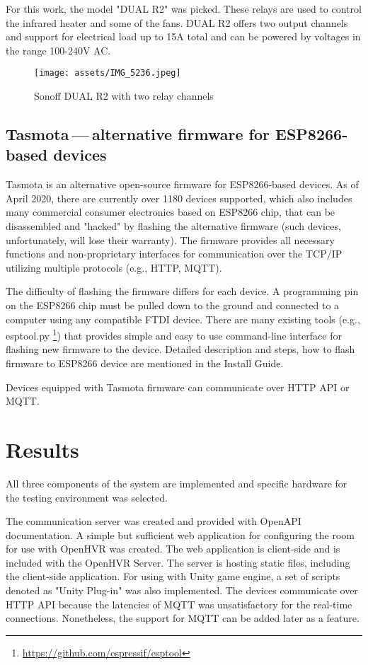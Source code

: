 For this work, the model "DUAL R2" was picked. These relays are used to
control the infrared heater and some of the fans. DUAL R2 offers two output
channels and support for electrical load up to 15A total and can be powered
by voltages in the range 100-240V AC.


\begin{figure}[h]{}
\centering\texttt{[image: assets/IMG\_5236.jpeg]}
\caption{Sonoff DUAL R2 with two relay channels}

\end{figure}

\hypertarget{x-tasmota — alternative-firmware-for-esp8266-based-devices}{\subsection{Tasmota — alternative firmware for ESP8266-based devices}}
Tasmota is an alternative open-source firmware for ESP8266-based devices.
As of April 2020, there are currently over 1180 devices supported\cite{tasdirec},
which also includes many commercial consumer electronics based on ESP8266 chip,
that can be disassembled and "hacked" by flashing the alternative firmware
(such devices, unfortunately, will lose their warranty).
The firmware provides all necessary functions and non-proprietary
interfaces for communication over the TCP/IP utilizing multiple protocols
(e.g., HTTP, MQTT).


The difficulty of flashing the firmware differs for each device. A programming pin
on the ESP8266 chip must be pulled down to the ground and connected to a computer using
any compatible FTDI device. There are many existing tools (e.g., esptool.py
\footnote{\href{https://github.com/espressif/esptool}{https://github.com/espressif/esptool}})
that provides simple and easy to use command-line
interface for flashing new firmware to the device. Detailed description and
steps, how to flash firmware to ESP8266 device are mentioned in the
Install Guide.

Devices equipped with Tasmota firmware can communicate over HTTP API or MQTT.

\hypertarget{x-results}{\section{Results}}
All three components of the system are implemented and specific hardware
for the testing environment was selected.


The communication server was created and provided with OpenAPI documentation.
A simple but sufficient web application for configuring the room for use with
OpenHVR was created. The web application is client-side and is included with
the OpenHVR Server. The server is hosting static files,
including the client-side application.
For using with Unity game engine, a set of scripts denoted as "Unity Plug-in"
was also implemented. The devices communicate over HTTP API because the
latencies of MQTT was unsatisfactory for the real-time connections. 
Nonetheless, the support for MQTT can be added later as a feature.

